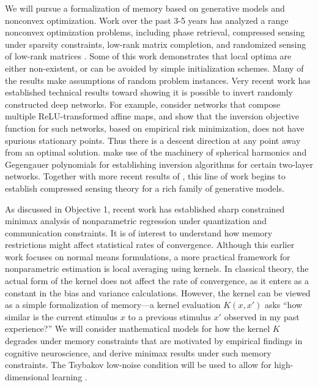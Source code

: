 We will pursue a formalization of memory based on generative models
and nonconvex optimization. Work over the past 3-5 years has analyzed a range nonconvex
optimization problems, including phase retrieval, compressed
sensing under sparsity constraints, low-rank matrix
completion, and randomized sensing of low-rank matrices
\citep{phaselift1,phaselift2,phaselift3,ZhaWanLiu15,WeiCaiCha16,ZheLaf15}.
Some of this work demonstrates that local optima are either
non-existent, or can be avoided by simple initialization schemes. Many
of the results make assumptions of random problem instances. Very
recent work has established technical results toward showing it is
possible to invert randomly constructed deep networks. For example,
\citet{HandV17} consider networks that compose multiple ReLU-transformed affine
maps, and show that the inversion objective function for such networks, based
on empirical risk minimization, does not have spurious stationary
points. Thus there is a descent direction at any point away from an optimal solution.
\citet{Mixon18} make use of the machinery of spherical harmonics and Gegengauer polynomials for
establishing inversion algorithms for certain two-layer
networks. Together with more recent results of \citet{HandV18}, this
line of work begins to establish compressed sensing theory for a rich
family of generative models.


As discussed in Objective 1, recent work has established 
sharp constrained minimax analysis of nonparametric
regression under quantization and communication
constraints.
It is of interest to understand how memory restrictions might affect
statistical rates of convergence. Although this earlier work focuses on
normal means formulations, a more practical framework for
nonparametric estimation is local averaging using kernels. In
classical theory, the actual form of the kernel does not affect the
rate of convergence, as it enters as a constant in the bias and
variance calculations. However, the kernel can be viewed as a
simple formalization of memory---a kernel evaluation $K(x,x')$ asks
``how similar is the current stimulus $x$ to a previous stimulus $x'$
observed in my past experience?'' We will consider mathematical models for
how the kernel $K$ degrades under memory constraints that
are motivated by empirical findings in cognitive neuroscience,
and derive minimax results under such memory constraints. The
Tsybakov low-noise condition will be used to allow for
high-dimensional learning \citep{mammen1999,tsybakov2004,audibert2007}.

